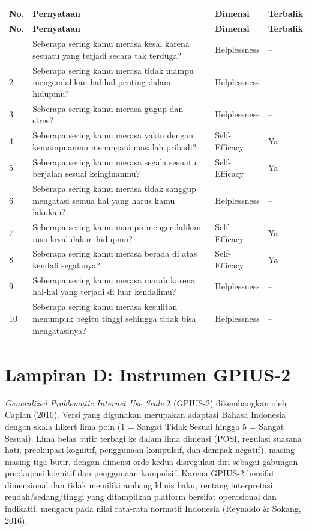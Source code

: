{\footnotesize
\renewcommand{\arraystretch}{1.3}
\begin{longtable}{|p{0.7cm}|p{7.5cm}|p{2.4cm}|p{1.4cm}|}
\hline
\textbf{No.} & \textbf{Pernyataan} & \textbf{Dimensi} & \textbf{Terbalik} \\
\hline
\endfirsthead
\hline
\textbf{No.} & \textbf{Pernyataan} & \textbf{Dimensi} & \textbf{Terbalik} \\
\hline
\endhead
\hline
\endfoot
1 & Seberapa sering kamu merasa kesal karena sesuatu yang terjadi secara tak terduga? & Helplessness & -- \\
\hline
2 & Seberapa sering kamu merasa tidak mampu mengendalikan hal-hal penting dalam hidupmu? & Helplessness & -- \\
\hline
3 & Seberapa sering kamu merasa gugup dan stres? & Helplessness & -- \\
\hline
4 & Seberapa sering kamu merasa yakin dengan kemampuanmu menangani masalah pribadi? & Self-Efficacy & Ya \\
\hline
5 & Seberapa sering kamu merasa segala sesuatu berjalan sesuai keinginanmu? & Self-Efficacy & Ya \\
\hline
6 & Seberapa sering kamu merasa tidak sanggup mengatasi semua hal yang harus kamu lakukan? & Helplessness & -- \\
\hline
7 & Seberapa sering kamu mampu mengendalikan rasa kesal dalam hidupmu? & Self-Efficacy & Ya \\
\hline
8 & Seberapa sering kamu merasa berada di atas kendali segalanya? & Self-Efficacy & Ya \\
\hline
9 & Seberapa sering kamu merasa marah karena hal-hal yang terjadi di luar kendalimu? & Helplessness & -- \\
\hline
10 & Seberapa sering kamu merasa kesulitan menumpuk begitu tinggi sehingga tidak bisa mengatasinya? & Helplessness & -- \\
\hline
\end{longtable}
}
\clearpage

\section*{Lampiran D: Instrumen GPIUS-2}

\textit{Generalized Problematic Internet Use Scale} 2 (GPIUS-2) dikembangkan oleh Caplan (2010). Versi yang digunakan merupakan adaptasi Bahasa Indonesia dengan skala Likert lima poin (1 = Sangat Tidak Sesuai hingga 5 = Sangat Sesuai). Lima belas butir terbagi ke dalam lima dimensi (POSI, regulasi suasana hati, preokupasi kognitif, penggunaan kompulsif, dan dampak negatif), masing-masing tiga butir, dengan dimensi orde-kedua disregulasi diri sebagai gabungan preokupasi kognitif dan penggunaan kompulsif. Karena GPIUS-2 bersifat dimensional dan tidak memiliki ambang klinis baku, rentang interpretasi rendah/sedang/tinggi yang ditampilkan platform bersifat operasional dan indikatif, mengacu pada nilai rata-rata normatif Indonesia (Reynaldo \& Sokang, 2016).

